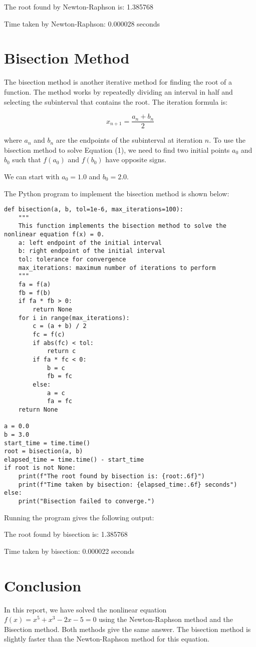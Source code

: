 \documentclass{article}
\begin{document}

The root found by Newton-Raphson is: 1.385768

Time taken by Newton-Raphson: 0.000028 seconds

\section{Bisection Method}

The bisection method is another iterative method for finding the root of a function. The method works by repeatedly dividing an interval in half and selecting the subinterval that contains the root. The iteration formula is:

\begin{equation}
    x_{n+1} = \frac{a_n + b_n}{2}
\end{equation}

where $a_n$ and $b_n$ are the endpoints of the subinterval at iteration $n$. To use the bisection method to solve Equation (1), we need to find two initial points $a_0$ and $b_0$ such that $f(a_0)$ and $f(b_0)$ have opposite signs.

We can start with $a_0 = 1.0$ and $b_0 = 2.0$.

The Python program to implement the bisection method is shown below:

\begin{lstlisting}
def bisection(a, b, tol=1e-6, max_iterations=100):
    """
    This function implements the bisection method to solve the nonlinear equation f(x) = 0.
    a: left endpoint of the initial interval
    b: right endpoint of the initial interval
    tol: tolerance for convergence
    max_iterations: maximum number of iterations to perform
    """
    fa = f(a)
    fb = f(b)
    if fa * fb > 0:
        return None
    for i in range(max_iterations):
        c = (a + b) / 2
        fc = f(c)
        if abs(fc) < tol:
            return c
        if fa * fc < 0:
            b = c
            fb = fc
        else:
            a = c
            fa = fc
    return None

a = 0.0
b = 3.0
start_time = time.time()
root = bisection(a, b)
elapsed_time = time.time() - start_time
if root is not None:
    print(f"The root found by bisection is: {root:.6f}")
    print(f"Time taken by bisection: {elapsed_time:.6f} seconds")
else:
    print("Bisection failed to converge.")

\end{lstlisting}

Running the program gives the following output:


The root found by bisection is: 1.385768

Time taken by bisection: 0.000022 seconds

\section{Conclusion}

In this report, we have solved the nonlinear equation $f(x) = x^5 + x^3 - 2x - 5 = 0$ using the Newton-Raphson method and the Bisection method. Both methods give the same answer. The bisection method is slightly faster than the Newton-Raphson method for this equation.
\end{document}
